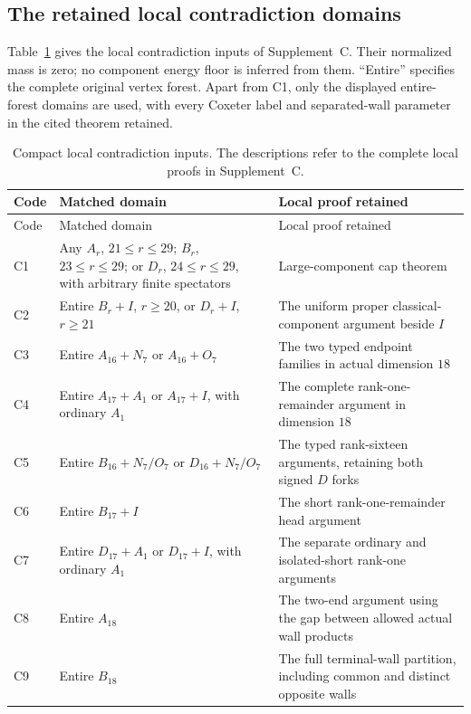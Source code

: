 \subsection{The retained local contradiction domains}
\label{c:local-exits}

Table~\ref{c:local-exit-table} gives the local contradiction inputs of
Supplement~C. Their normalized mass is zero; no component energy floor
is inferred from them. ``Entire'' specifies the complete original
vertex forest. Apart from C1, only the displayed entire-forest domains
are used, with every Coxeter label and separated-wall parameter in the
cited theorem retained.

\begin{longtable}{>{\raggedright\arraybackslash}p{.08\linewidth}
 >{\raggedright\arraybackslash}p{.43\linewidth}
 >{\raggedright\arraybackslash}p{.39\linewidth}}
\caption{Compact local contradiction inputs. The descriptions refer to
the complete local proofs in Supplement~C.}\label{c:local-exit-table}\\
\toprule
Code&Matched domain&Local proof retained\\\midrule
\endfirsthead
\toprule Code&Matched domain&Local proof retained\\\midrule\endhead
C1&Any $A_r$, $21\le r\le29$; $B_r$, $23\le r\le29$;
 or $D_r$, $24\le r\le29$, with arbitrary finite spectators&
 Large-component cap theorem\\
C2&Entire $B_r+I$, $r\ge20$, or $D_r+I$, $r\ge21$&
 The uniform proper classical-component argument beside $I$\\
C3&Entire $A_{16}+N_7$ or $A_{16}+O_7$&
 The two typed endpoint families in actual dimension $18$\\
C4&Entire $A_{17}+A_1$ or $A_{17}+I$, with ordinary $A_1$&
 The complete rank-one-remainder argument in dimension $18$\\
C5&Entire $B_{16}+N_7/O_7$ or $D_{16}+N_7/O_7$&
 The typed rank-sixteen arguments, retaining both signed $D$ forks\\
C6&Entire $B_{17}+I$&The short rank-one-remainder head argument\\
C7&Entire $D_{17}+A_1$ or $D_{17}+I$, with ordinary $A_1$&
 The separate ordinary and isolated-short rank-one arguments\\
C8&Entire $A_{18}$&The two-end argument using the gap between
 allowed actual wall products\\
C9&Entire $B_{18}$&The full terminal-wall partition, including common
 and distinct opposite walls\\

\end{longtable}
